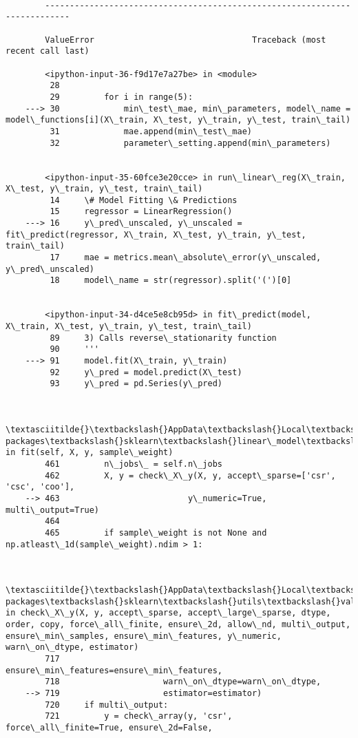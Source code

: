 \documentclass[11pt]{article}
\begin{document}
    \begin{Verbatim}[commandchars=\\\{\}]

        ---------------------------------------------------------------------------

        ValueError                                Traceback (most recent call last)

        <ipython-input-36-f9d17e7a27be> in <module>
         28 
         29         for i in range(5):
    ---> 30             min\_test\_mae, min\_parameters, model\_name = model\_functions[i](X\_train, X\_test, y\_train, y\_test, train\_tail)
         31             mae.append(min\_test\_mae)
         32             parameter\_setting.append(min\_parameters)
    

        <ipython-input-35-60fce3e20cce> in run\_linear\_reg(X\_train, X\_test, y\_train, y\_test, train\_tail)
         14     \# Model Fitting \& Predictions
         15     regressor = LinearRegression()
    ---> 16     y\_pred\_unscaled, y\_unscaled = fit\_predict(regressor, X\_train, X\_test, y\_train, y\_test, train\_tail)
         17     mae = metrics.mean\_absolute\_error(y\_unscaled, y\_pred\_unscaled)
         18     model\_name = str(regressor).split('(')[0]
    

        <ipython-input-34-d4ce5e8cb95d> in fit\_predict(model, X\_train, X\_test, y\_train, y\_test, train\_tail)
         89     3) Calls reverse\_stationarity function 
         90     '''
    ---> 91     model.fit(X\_train, y\_train)
         92     y\_pred = model.predict(X\_test)
         93     y\_pred = pd.Series(y\_pred)
    

        \textasciitilde{}\textbackslash{}AppData\textbackslash{}Local\textbackslash{}Continuum\textbackslash{}anaconda3\textbackslash{}lib\textbackslash{}site-packages\textbackslash{}sklearn\textbackslash{}linear\_model\textbackslash{}base.py in fit(self, X, y, sample\_weight)
        461         n\_jobs\_ = self.n\_jobs
        462         X, y = check\_X\_y(X, y, accept\_sparse=['csr', 'csc', 'coo'],
    --> 463                          y\_numeric=True, multi\_output=True)
        464 
        465         if sample\_weight is not None and np.atleast\_1d(sample\_weight).ndim > 1:
    

        \textasciitilde{}\textbackslash{}AppData\textbackslash{}Local\textbackslash{}Continuum\textbackslash{}anaconda3\textbackslash{}lib\textbackslash{}site-packages\textbackslash{}sklearn\textbackslash{}utils\textbackslash{}validation.py in check\_X\_y(X, y, accept\_sparse, accept\_large\_sparse, dtype, order, copy, force\_all\_finite, ensure\_2d, allow\_nd, multi\_output, ensure\_min\_samples, ensure\_min\_features, y\_numeric, warn\_on\_dtype, estimator)
        717                     ensure\_min\_features=ensure\_min\_features,
        718                     warn\_on\_dtype=warn\_on\_dtype,
    --> 719                     estimator=estimator)
        720     if multi\_output:
        721         y = check\_array(y, 'csr', force\_all\_finite=True, ensure\_2d=False,
    


\end{Verbatim}
\end{document}
